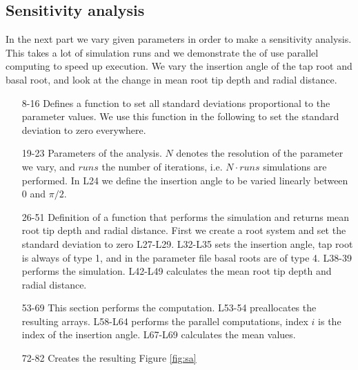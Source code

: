 \documentclass[a4paper]{article}
\begin{document}
\subsection{Sensitivity analysis} \label{sec:sa}

In the next part we vary given parameters in order to make a sensitivity analysis. This takes a lot of simulation runs and we demonstrate the of use parallel computing to speed up execution.
We vary the insertion angle of the tap root and basal root, and look at the change in mean root tip depth and radial distance. 



\begin{itemize}

\item[8-16] Defines a function to set all standard deviations proportional to the parameter values. We use this function in the following to set the standard deviation to zero everywhere. 

\item[19-23] Parameters of the analysis. $N$ denotes the resolution of the parameter we vary, and $runs$ the number of iterations, i.e. $N\cdot runs$ simulations are performed. 
In L24 we define the insertion angle to be varied linearly between 0 and $\pi/2$.

\item[26-51] Definition of a function that performs the simulation and returns mean root tip depth and radial distance. First we create a root system and set the standard deviation to zero L27-L29. 
L32-L35 sets the insertion angle, tap root is always of type 1, and in the parameter file basal roots are of type 4. L38-39 performs the simulation. 
L42-L49 calculates the mean root tip depth and radial distance. 

\item[53-69] This section performs the computation. L53-54 preallocates the resulting arrays. L58-L64 performs the parallel computations, index $i$ is the index of the insertion angle. L67-L69 calculates the mean values.

\item[72-82] Creates the resulting Figure \ref{fig:sa}

\end{itemize}
\end{document}
